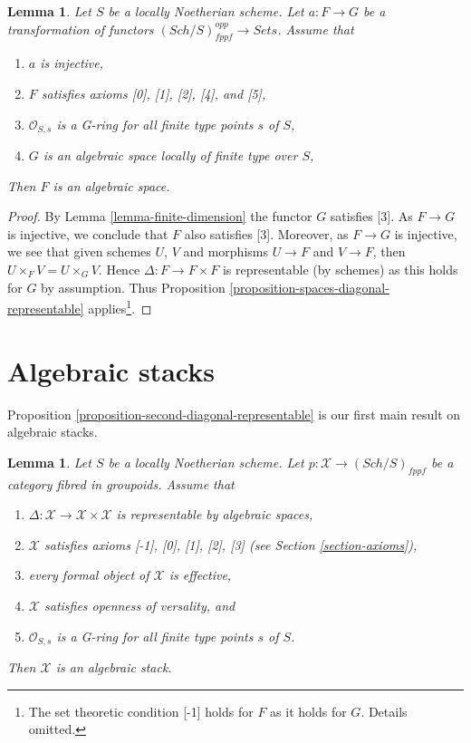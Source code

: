 \documentclass{stacks-project}
\theoremstyle{plain}
\newtheorem{lemma}[subsection]{Lemma}
\theoremstyle{definition}
\theoremstyle{remark}
\numberwithin{equation}{subsection}
\def\Sch{\mathit{Sch}}
\begin{document}
\begin{lemma}
\label{lemma-monomorphism}
Let $S$ be a locally Noetherian scheme. Let $a : F \to G$ be a transformation
of functors $(\Sch/S)_{fppf}^{opp} \to \textit{Sets}$.
Assume that
\begin{enumerate}
\item $a$ is injective,
\item $F$ satisfies axioms [0], [1], [2], [4], and [5],
\item $\mathcal{O}_{S, s}$ is a G-ring for all finite type points $s$ of $S$,
\item $G$ is an algebraic space locally of finite type over $S$,
\end{enumerate}
Then $F$ is an algebraic space.
\end{lemma}

\begin{proof}
By Lemma \ref{lemma-finite-dimension} the functor $G$ satisfies [3].
As $F \to G$ is injective, we conclude that $F$ also satisfies [3].
Moreover, as $F \to G$ is injective, we see that given schemes
$U$, $V$ and morphisms $U \to F$ and $V \to F$, then
$U \times_F V = U \times_G V$. Hence $\Delta : F \to F \times F$ is
representable (by schemes) as this holds for $G$ by assumption.
Thus Proposition \ref{proposition-spaces-diagonal-representable}
applies\footnote{The set
theoretic condition [-1] holds for $F$ as it holds for $G$. Details
omitted.}.
\end{proof}












\section{Algebraic stacks}
\label{section-algebraic-stacks}

\noindent
Proposition \ref{proposition-second-diagonal-representable} is our first
main result on algebraic stacks.

\begin{lemma}
\label{lemma-diagonal-representable}
Let $S$ be a locally Noetherian scheme. Let
$p : \mathcal{X} \to (\Sch/S)_{fppf}$ be a category fibred in groupoids.
Assume that
\begin{enumerate}
\item $\Delta : \mathcal{X} \to \mathcal{X} \times \mathcal{X}$
is representable by algebraic spaces,
\item $\mathcal{X}$ satisfies axioms [-1], [0], [1], [2], [3] (see
Section \ref{section-axioms}),
\item every formal object of $\mathcal{X}$ is effective,
\item $\mathcal{X}$ satisfies openness of versality, and
\item $\mathcal{O}_{S, s}$ is a G-ring for all finite type points $s$ of $S$.
\end{enumerate}
Then $\mathcal{X}$ is an algebraic stack.
\end{lemma}
\end{document}
